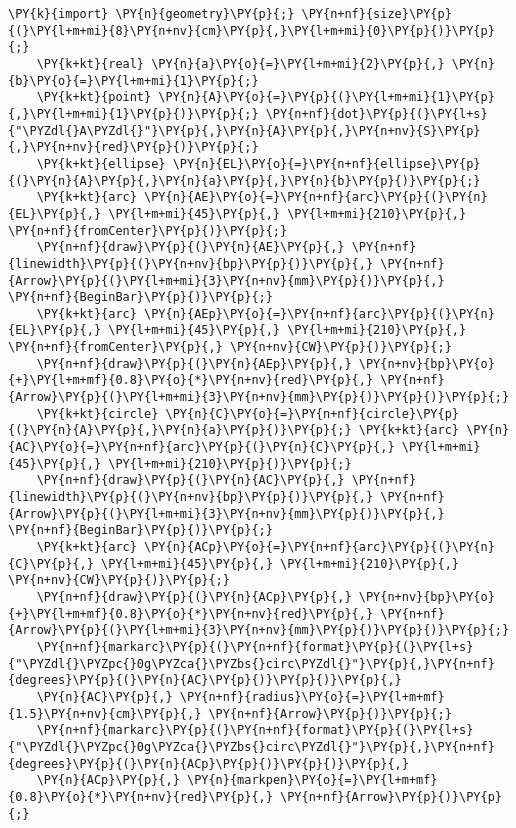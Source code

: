 \begin{Verbatim}[commandchars=\\\{\}]
    \PY{k}{import} \PY{n}{geometry}\PY{p}{;} \PY{n+nf}{size}\PY{p}{(}\PY{l+m+mi}{8}\PY{n+nv}{cm}\PY{p}{,}\PY{l+m+mi}{0}\PY{p}{)}\PY{p}{;}
    \PY{k+kt}{real} \PY{n}{a}\PY{o}{=}\PY{l+m+mi}{2}\PY{p}{,} \PY{n}{b}\PY{o}{=}\PY{l+m+mi}{1}\PY{p}{;}
    \PY{k+kt}{point} \PY{n}{A}\PY{o}{=}\PY{p}{(}\PY{l+m+mi}{1}\PY{p}{,}\PY{l+m+mi}{1}\PY{p}{)}\PY{p}{;} \PY{n+nf}{dot}\PY{p}{(}\PY{l+s}{"\PYZdl{}A\PYZdl{}"}\PY{p}{,}\PY{n}{A}\PY{p}{,}\PY{n+nv}{S}\PY{p}{,}\PY{n+nv}{red}\PY{p}{)}\PY{p}{;}
    \PY{k+kt}{ellipse} \PY{n}{EL}\PY{o}{=}\PY{n+nf}{ellipse}\PY{p}{(}\PY{n}{A}\PY{p}{,}\PY{n}{a}\PY{p}{,}\PY{n}{b}\PY{p}{)}\PY{p}{;}
    \PY{k+kt}{arc} \PY{n}{AE}\PY{o}{=}\PY{n+nf}{arc}\PY{p}{(}\PY{n}{EL}\PY{p}{,} \PY{l+m+mi}{45}\PY{p}{,} \PY{l+m+mi}{210}\PY{p}{,} \PY{n+nf}{fromCenter}\PY{p}{)}\PY{p}{;}
    \PY{n+nf}{draw}\PY{p}{(}\PY{n}{AE}\PY{p}{,} \PY{n+nf}{linewidth}\PY{p}{(}\PY{n+nv}{bp}\PY{p}{)}\PY{p}{,} \PY{n+nf}{Arrow}\PY{p}{(}\PY{l+m+mi}{3}\PY{n+nv}{mm}\PY{p}{)}\PY{p}{,} \PY{n+nf}{BeginBar}\PY{p}{)}\PY{p}{;}
    \PY{k+kt}{arc} \PY{n}{AEp}\PY{o}{=}\PY{n+nf}{arc}\PY{p}{(}\PY{n}{EL}\PY{p}{,} \PY{l+m+mi}{45}\PY{p}{,} \PY{l+m+mi}{210}\PY{p}{,} \PY{n+nf}{fromCenter}\PY{p}{,} \PY{n+nv}{CW}\PY{p}{)}\PY{p}{;}
    \PY{n+nf}{draw}\PY{p}{(}\PY{n}{AEp}\PY{p}{,} \PY{n+nv}{bp}\PY{o}{+}\PY{l+m+mf}{0.8}\PY{o}{*}\PY{n+nv}{red}\PY{p}{,} \PY{n+nf}{Arrow}\PY{p}{(}\PY{l+m+mi}{3}\PY{n+nv}{mm}\PY{p}{)}\PY{p}{)}\PY{p}{;}
    \PY{k+kt}{circle} \PY{n}{C}\PY{o}{=}\PY{n+nf}{circle}\PY{p}{(}\PY{n}{A}\PY{p}{,}\PY{n}{a}\PY{p}{)}\PY{p}{;} \PY{k+kt}{arc} \PY{n}{AC}\PY{o}{=}\PY{n+nf}{arc}\PY{p}{(}\PY{n}{C}\PY{p}{,} \PY{l+m+mi}{45}\PY{p}{,} \PY{l+m+mi}{210}\PY{p}{)}\PY{p}{;}
    \PY{n+nf}{draw}\PY{p}{(}\PY{n}{AC}\PY{p}{,} \PY{n+nf}{linewidth}\PY{p}{(}\PY{n+nv}{bp}\PY{p}{)}\PY{p}{,} \PY{n+nf}{Arrow}\PY{p}{(}\PY{l+m+mi}{3}\PY{n+nv}{mm}\PY{p}{)}\PY{p}{,} \PY{n+nf}{BeginBar}\PY{p}{)}\PY{p}{;}
    \PY{k+kt}{arc} \PY{n}{ACp}\PY{o}{=}\PY{n+nf}{arc}\PY{p}{(}\PY{n}{C}\PY{p}{,} \PY{l+m+mi}{45}\PY{p}{,} \PY{l+m+mi}{210}\PY{p}{,} \PY{n+nv}{CW}\PY{p}{)}\PY{p}{;}
    \PY{n+nf}{draw}\PY{p}{(}\PY{n}{ACp}\PY{p}{,} \PY{n+nv}{bp}\PY{o}{+}\PY{l+m+mf}{0.8}\PY{o}{*}\PY{n+nv}{red}\PY{p}{,} \PY{n+nf}{Arrow}\PY{p}{(}\PY{l+m+mi}{3}\PY{n+nv}{mm}\PY{p}{)}\PY{p}{)}\PY{p}{;}
    \PY{n+nf}{markarc}\PY{p}{(}\PY{n+nf}{format}\PY{p}{(}\PY{l+s}{"\PYZdl{}\PYZpc{}0g\PYZca{}\PYZbs{}circ\PYZdl{}"}\PY{p}{,}\PY{n+nf}{degrees}\PY{p}{(}\PY{n}{AC}\PY{p}{)}\PY{p}{)}\PY{p}{,}
    \PY{n}{AC}\PY{p}{,} \PY{n+nf}{radius}\PY{o}{=}\PY{l+m+mf}{1.5}\PY{n+nv}{cm}\PY{p}{,} \PY{n+nf}{Arrow}\PY{p}{)}\PY{p}{;}
    \PY{n+nf}{markarc}\PY{p}{(}\PY{n+nf}{format}\PY{p}{(}\PY{l+s}{"\PYZdl{}\PYZpc{}0g\PYZca{}\PYZbs{}circ\PYZdl{}"}\PY{p}{,}\PY{n+nf}{degrees}\PY{p}{(}\PY{n}{ACp}\PY{p}{)}\PY{p}{)}\PY{p}{,}
    \PY{n}{ACp}\PY{p}{,} \PY{n}{markpen}\PY{o}{=}\PY{l+m+mf}{0.8}\PY{o}{*}\PY{n+nv}{red}\PY{p}{,} \PY{n+nf}{Arrow}\PY{p}{)}\PY{p}{;}
\end{Verbatim}
